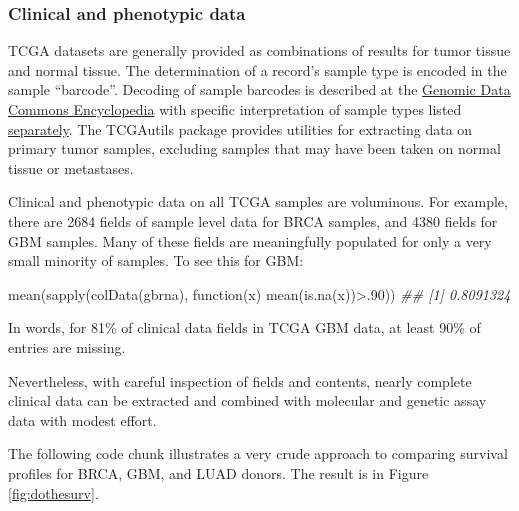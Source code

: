 \documentclass[]{article}
\newcommand{\hlnum}[1]{\textcolor[rgb]{0.816,0.125,0.439}{#1}}%
\newcommand{\hlcom}[1]{\textcolor[rgb]{0.502,0.502,0.502}{\textit{#1}}}%
\newcommand{\hlopt}[1]{\textcolor[rgb]{0,0,0}{#1}}%
\newcommand{\hlstd}[1]{\textcolor[rgb]{0.251,0.251,0.251}{#1}}%
\newcommand{\hlkwd}[1]{\textcolor[rgb]{0.878,0.439,0.125}{#1}}%
\newenvironment{Shaded}{\begin{myshaded}}{\end{myshaded}}
\newcommand{\KeywordTok}[1]{\hlkwd{#1}}
\newcommand{\DecValTok}[1]{\hlnum{#1}}
\newcommand{\CommentTok}[1]{\hlcom{#1}}
\newcommand{\ControlFlowTok}[1]{\hlkwd{#1}}
\newcommand{\OperatorTok}[1]{\hlopt{#1}}
\newcommand{\NormalTok}[1]{\hlstd{#1}}
\begin{document}
\hypertarget{clinical-and-phenotypic-data}{%
\subsubsection{Clinical and phenotypic data}\label{clinical-and-phenotypic-data}}

TCGA datasets are generally provided as combinations of
results for tumor tissue and normal tissue. The determination
of a record's sample type is encoded in the sample ``barcode''.
Decoding of sample barcodes is described at the \href{https://docs.gdc.cancer.gov/Encyclopedia/pages/TCGA_Barcode/}{Genomic Data Commons Encyclopedia} with specific interpretation of sample types listed \href{https://gdc.cancer.gov/resources-tcga-users/tcga-code-tables/sample-type-codes}{separately}. The TCGAutils package provides utilities for extracting
data on primary tumor samples, excluding samples that may have been taken on
normal tissue or metastases.

Clinical and phenotypic data on all TCGA samples are voluminous. For example,
there are 2684 fields of sample level data for BRCA
samples, and 4380 fields for GBM samples. Many of these
fields are meaningfully populated for only a very small minority of samples.
To see this for GBM:

\begin{Shaded}
\begin{Highlighting}[]
\KeywordTok{mean}\NormalTok{(}\KeywordTok{sapply}\NormalTok{(}\KeywordTok{colData}\NormalTok{(gbrna), }\ControlFlowTok{function}\NormalTok{(x) }\KeywordTok{mean}\NormalTok{(}\KeywordTok{is.na}\NormalTok{(x))}\OperatorTok{\textgreater{}}\NormalTok{.}\DecValTok{90}\NormalTok{))}
\CommentTok{\#\# [1] 0.8091324}
\end{Highlighting}
\end{Shaded}

In words, for 81\% of clinical data fields in TCGA GBM data,
at least 90\% of entries are missing.

Nevertheless, with careful inspection of fields and contents,
nearly complete clinical data can be extracted and combined with molecular
and genetic assay data with modest effort.

The following code chunk illustrates a very crude
approach to comparing survival profiles for BRCA, GBM, and LUAD
donors. The result is in Figure \ref{fig:dothesurv}.
\end{document}
